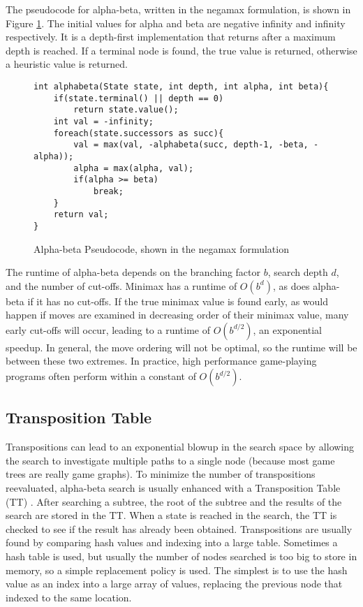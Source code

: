 The pseudocode for alpha-beta, written in the negamax formulation, is shown in Figure \ref{fig:abcode}. The initial values for alpha and beta are negative infinity and infinity respectively. It is a depth-first implementation that returns after a maximum depth is reached. If a terminal node is found, the true value is returned, otherwise a heuristic value is returned.

\begin{figure}

\begin{lstlisting}
int alphabeta(State state, int depth, int alpha, int beta){
	if(state.terminal() || depth == 0)
		return state.value();
	int val = -infinity;
	foreach(state.successors as succ){
		val = max(val, -alphabeta(succ, depth-1, -beta, -alpha));
		alpha = max(alpha, val);
		if(alpha >= beta)
			break;
	}
	return val;
}
\end{lstlisting}

\caption[Alpha-beta Pseudocode]{Alpha-beta Pseudocode, shown in the negamax formulation}
\label{fig:abcode}
\end{figure}

The runtime of alpha-beta depends on the branching factor $b$, search depth $d$, and the number of cut-offs. Minimax has a runtime of $O(b^d)$, as does alpha-beta if it has no cut-offs. If the true minimax value is found early, as would happen if moves are examined in decreasing order of their minimax value, many early cut-offs will occur, leading to a runtime of $O(b^{d/2})$, an exponential speedup. In general, the move ordering will not be optimal, so the runtime will be between these two extremes. In practice, high performance game-playing programs often perform within a constant of $O(b^{d/2})$.

\subsection{Transposition Table}

Transpositions can lead to an exponential blowup in the search space by allowing the search to investigate multiple paths to a single node (because most game trees are really game graphs). To minimize the number of transpositions reevaluated, alpha-beta search is usually enhanced with a Transposition Table (TT) \cite{slate1977chess}. After searching a subtree, the root of the subtree and the results of the search are stored in the TT. When a state is reached in the search, the TT is checked to see if the result has already been obtained. Transpositions are usually found by comparing hash values and indexing into a large table. Sometimes a hash table is used, but usually the number of nodes searched is too big to store in memory, so a simple replacement policy is used. The simplest is to use the hash value as an index into a large array of values, replacing the previous node that indexed to the same location.

